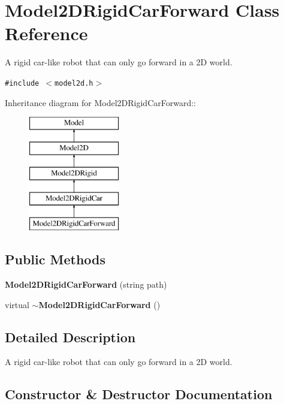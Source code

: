 \section{Model2DRigid\-Car\-Forward  Class Reference}
\label{class_Model2DRigidCarForward}
A rigid car-like robot that can only go forward in a 2D world. 


{\tt \#include $<$model2d.h$>$}

Inheritance diagram for Model2DRigid\-Car\-Forward::\begin{figure}[H]
\begin{center}
\leavevmode
\includegraphics[height=5cm]{class_Model2DRigidCarForward}
\end{center}
\end{figure}
\subsection*{Public Methods}
\begin{CompactItemize}
\item 
{\bf Model2DRigid\-Car\-Forward} (string path)
\item 
virtual {\bf $\sim$Model2DRigid\-Car\-Forward} ()
\end{CompactItemize}


\subsection{Detailed Description}
A rigid car-like robot that can only go forward in a 2D world.



\subsection{Constructor \& Destructor Documentation}
